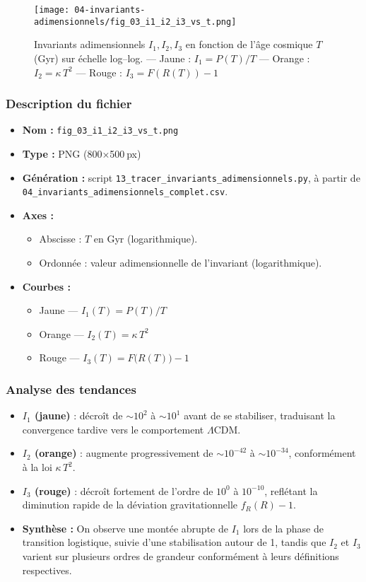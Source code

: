 \begin{figure}[htbp]
  \centering
  \texttt{[image: 04-invariants-adimensionnels/fig\_03\_i1\_i2\_i3\_vs\_t.png]}
  \caption{Invariants adimensionnels \(I_{1},I_{2},I_{3}\) en fonction de l’âge cosmique \(T\) (Gyr) sur échelle log–log.
    — Jaune : \(I_{1}=P(T)/T\)
    — Orange : \(I_{2}=\kappa\,T^{2}\)
    — Rouge : \(I_{3}=F(R(T))-1\)}
  \label{fig:invariants_vs_t}
\end{figure}

\subsubsection*{Description du fichier}
\begin{itemize}
  \item \textbf{Nom :} \texttt{fig\_03\_i1\_i2\_i3\_vs\_t.png}
  \item \textbf{Type :} PNG (800×500 px)
  \item \textbf{Génération :} script \texttt{13\_tracer\_invariants\_adimensionnels.py}, à partir de \texttt{04\_invariants\_adimensionnels\_complet.csv}.
  \item \textbf{Axes :}
    \begin{itemize}
      \item Abscisse : \(T\) en Gyr (logarithmique).
      \item Ordonnée : valeur adimensionnelle de l’invariant (logarithmique).
    \end{itemize}
  \item \textbf{Courbes :}
    \begin{itemize}
      \item Jaune — \(I_{1}(T)=P(T)/T\)
      \item Orange — \(I_{2}(T)=\kappa\,T^{2}\)
      \item Rouge — \(I_{3}(T)=F\bigl(R(T)\bigr)-1\)
    \end{itemize}
\end{itemize}

\subsubsection*{Analyse des tendances}
\begin{itemize}
  \item \textbf{\(I_{1}\) (jaune)} :
    décroît de \(\sim10^{2}\) à \(\sim10^{1}\) avant de se stabiliser, traduisant la convergence tardive vers le comportement \(\Lambda\)CDM.
  \item \textbf{\(I_{2}\) (orange)} :
    augmente progressivement de \(\sim10^{-42}\) à \(\sim10^{-34}\), conformément à la loi \(\kappa\,T^{2}\).
  \item \textbf{\(I_{3}\) (rouge)} :
    décroît fortement de l’ordre de \(10^{0}\) à \(10^{-10}\), reflétant la diminution rapide de la déviation gravitationnelle \(f_{R}(R)-1\).
  \item \textbf{Synthèse :}
    On observe une montée abrupte de \(I_{1}\) lors de la phase de transition logistique, suivie d’une stabilisation autour de 1, tandis que \(I_{2}\) et \(I_{3}\) varient sur plusieurs ordres de grandeur conformément à leurs définitions respectives.
\end{itemize}

